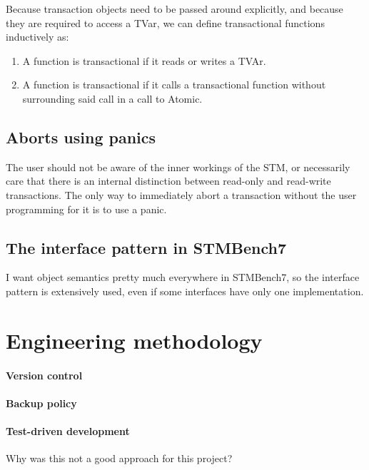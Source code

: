 \documentclass[12pt,a4paper,oneside,openright]{report}
\begin{document}
Because transaction objects need to be passed around explicitly, and
because they are required to access a TVar, we can define
transactional functions inductively as:

\begin{enumerate}
\item A function is transactional if it reads or writes a TVAr.
\item A function is transactional if it calls a transactional function
  without surrounding said call in a call to Atomic.
\end{enumerate}

\subsection{Aborts using panics}
\label{sec:prep:aborts-using-panics}

The user should not be aware of the inner workings of the STM, or
necessarily care that there is an internal distinction between
read-only and read-write transactions. The only way to immediately
abort a transaction without the user programming for it is to use a
panic.

\subsection{The interface pattern in STMBench7}
\label{sec:prep:interf-patt-stmb}

I want object semantics pretty much everywhere in STMBench7, so the
interface pattern is extensively used, even if some interfaces have
only one implementation.

\section{Engineering methodology}
\label{sec:engin-meth}

\paragraph{Version control}

\paragraph{Backup policy}

\paragraph{Test-driven development}
Why was this not a good approach for this project?
\end{document}
